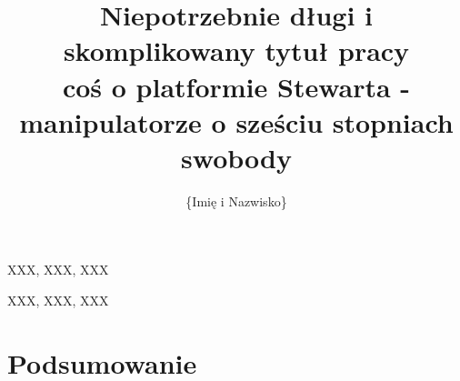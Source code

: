 \documentclass[
    left=2.5cm,         %
    right=2.5cm,        %
    top=2.5cm,          %
    bottom=3cm,         %
    bindingoffset=6mm,  %
    nohyphenation=false %
]{eiti/eiti-thesis}
\begin{document}
\EngineerThesis %
{}
\title{
    Niepotrzebnie długi i skomplikowany tytuł pracy \\ 
    coś o platformie Stewarta - manipulatorze o sześciu stopniach swobody 
}
\author{\{Imię i Nazwisko\}}
\date{\the\year}
\maketitle

\streszczenie \lipsum[1-3]
\slowakluczowe XXX, XXX, XXX
\newpage

\abstract \kant[1-3]
\keywords XXX, XXX, XXX
\newpage

\makeauthorship
\blankpage

\thispagestyle{empty}
\tableofcontents
\cleardoublepage




\newpage %
\section{Podsumowanie}      %
\lipsum[5-7]

\newpage
\printbibliography
\end{document}
